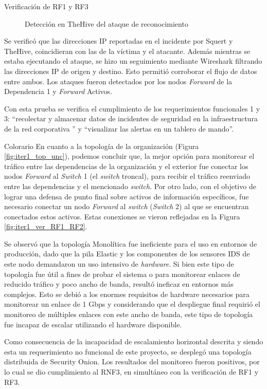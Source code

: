 \begin{section}{Verificación de RF1 y RF3}
\begin{figure}[H]
    \caption{Detección en TheHive del ataque de reconocimiento}
    \label{fig:thehive-nmap}
    \end{figure}
    \FloatBarrier
    Se verificó que las direcciones IP reportadas en el incidente por Squert y TheHive, coincidieran con las de la víctima y el atacante. Además mientras se estaba ejecutando el ataque, se hizo un seguimiento mediante Wireshark \cite{wireshark} filtrando las direcciones IP de origen y destino. Esto permitió corroborar el flujo de datos entre ambos.
    Los ataques fueron detectados por los nodos \textit{Forward} de la Dependencia 1 y \textit{Forward} Activos. \par
    Con esta prueba se verifica el cumplimiento de los requerimientos funcionales 1 y 3: “recolectar y almacenar datos de incidentes de seguridad en la infraestructura de la red corporativa ” y “visualizar las alertas en un tablero de mando”.\par
    \end{section} 
    
    
    \begin{section}{Colorario}
    En cuanto a la topología de la organización (Figura \ref{fig:iter1_top_unc}), podemos concluir que, la mejor opción para monitorear el tráfico entre las dependencias de la organización y el exterior fue conectar los nodos \textit{Forward} al \textit{Switch} 1 (el \textit{switch} troncal), para recibir el tráfico reenviado entre las dependencias y el mencionado \textit{switch}. Por otro lado, con el objetivo de lograr una defensa de punto final sobre activos de información específicos, fue necesario conectar un nodo \textit{Forward} al \textit{switch} (\textit{Switch} 2) al que se encuentran conectados estos activos. Estas conexiones se vieron reflejadas en la Figura \ref{fig:iter1_ver_RF1_RF2}. \par
    Se observó que la topología Monolítica fue ineficiente para el uso en entornos de producción, dado que la pila Elastic y los componentes de los sensores IDS de este nodo demandaron un uso intensivo de \textit{hardware}. Si bien este tipo de topología fue útil a fines de probar el sistema o para monitorear enlaces de reducido tráfico y poco ancho de banda, resultó ineficaz en entornos más complejos. Esto se debió a los enormes requisitos de hardware necesarios para monitorear un enlace de 1 Gbps y considerando que el despliegue final requirió el monitoreo de múltiples enlaces con este ancho de banda, este tipo de topología fue incapaz de escalar utilizando el hardware disponible.\par
    Como consecuencia de la incapacidad de escalamiento horizontal descrita y siendo esta un requerimiento no funcional de este proyecto, se desplegó una topología distribuida de Security Onion. Los resultados del monitoreo fueron positivos, por lo cual se dio cumplimiento al RNF3, en simultáneo con la verificación de RF1 y RF3.\par
    

    \end{section}